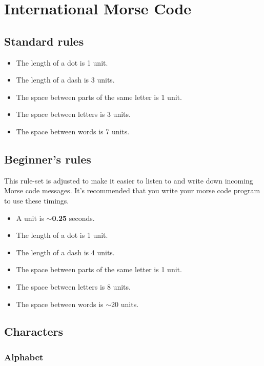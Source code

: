 \section{International Morse Code}

\small

	\subsection*{Standard rules}
	
		\begin{itemize}[noitemsep]
			\item The length of a dot is 1 unit.
			\item The length of a dash is 3 units.
			\item The space between parts of the same letter is 1 unit.
			\item The space between letters is 3 units.
			\item The space between words is 7 units.
		\end{itemize}
	
	\subsection*{Beginner's rules}
	
		This rule-set is adjusted to make it easier to listen to and write down incoming Morse code messages. It's recommended that you write your morse code program to use these timings.
		
		\begin{itemize}[noitemsep]
			\item A unit is $\sim$\textbf{0.25} seconds.
			\item The length of a dot is 1 unit.
			\item The length of a dash is 4 units.
			\item The space between parts of the same letter is 1 unit.
			\item The space between letters is 8 units.
			\item The space between words is $\sim$20 units.
		\end{itemize}

	\subsection*{Characters}

	\subsubsection*{Alphabet}
	
